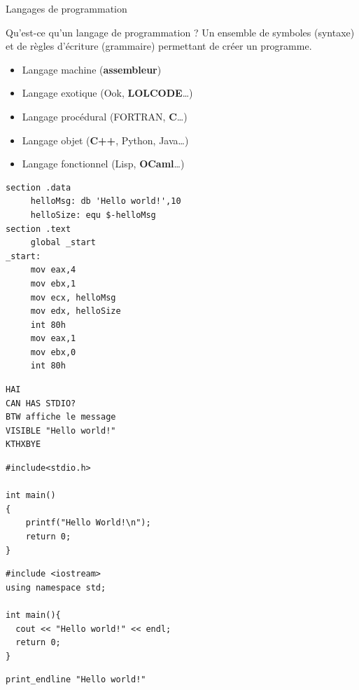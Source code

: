 \begin{frame}[fragile]{Langages de programmation}
  \begin{block}{Qu'est-ce qu'un langage de programmation ?}
  Un ensemble de symboles (syntaxe) et de règles d'écriture (grammaire) permettant de créer un programme.
  \end{block}
  \begin{minipage}{0.40\linewidth}
	\begin{itemize}[<+->]
		\item Langage machine (\textbf{assembleur})
		\item Langage exotique (Ook, \textbf{LOLCODE}\dots)
		\item Langage procédural (FORTRAN, \textbf{C}\dots)
		\item Langage objet (\textbf{C++}, Python, Java\dots)
		\item Langage fonctionnel (Lisp, \textbf{OCaml}\dots)
	\end{itemize}
  \end{minipage}
  \hfill
  \begin{minipage}{0.58\linewidth}
	\begin{overprint}
	\begin{verbatim}
section .data
     helloMsg: db 'Hello world!',10
     helloSize: equ $-helloMsg
section .text
     global _start
_start:
     mov eax,4
     mov ebx,1
     mov ecx, helloMsg
     mov edx, helloSize
     int 80h
     mov eax,1
     mov ebx,0
     int 80h
	\end{verbatim}
	\begin{verbatim}
HAI
CAN HAS STDIO?
BTW affiche le message
VISIBLE "Hello world!"
KTHXBYE
	\end{verbatim}
	\begin{verbatim}
#include<stdio.h>

int main()
{
    printf("Hello World!\n");
    return 0;
}
	\end{verbatim}
	\begin{verbatim}
#include <iostream>
using namespace std;

int main(){
  cout << "Hello world!" << endl;
  return 0;
}
	\end{verbatim}
	\begin{verbatim}
print_endline "Hello world!"
	\end{verbatim}
	\end{overprint}
  \end{minipage}
\end{frame}

